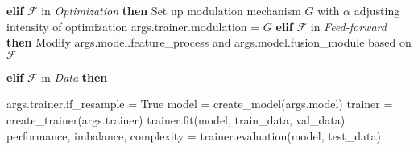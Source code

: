 \begin{algorithm}[t]
\begin{algorithmic}
\STATE \hspace*{-1em}\textbf{elif} $\mathcal{F}$ in \textit{Optimization} \textbf{then}
\STATE \hspace*{0em}Set up modulation mechanism $G$ with $\alpha$ adjusting intensity of optimization
\STATE \hspace*{0em}args.trainer.modulation = $G$
\STATE \hspace*{-1em}\textbf{elif} $\mathcal{F}$ in \textit{Feed-forward} \textbf{then}
\STATE \hspace*{0em}Modify args.model.feature\_process and args.model.fusion\_module based on $\mathcal{F}$

\STATE \hspace*{-1em}\textbf{elif} $\mathcal{F}$ in \textit{Data} \textbf{then}

\STATE \hspace*{0em} args.trainer.if\_resample = True
\STATE \hspace*{-1em}model = create\_model(args.model)
\STATE \hspace*{-1em}trainer = create\_trainer(args.trainer)
\STATE \hspace*{-1em}trainer.fit(model, train\_data, val\_data)
\STATE \hspace*{-1em}performance, imbalance, complexity = 
\STATE \hspace*{-1em}trainer.evaluation(model, test\_data)
\end{algorithmic}
\end{algorithm}
